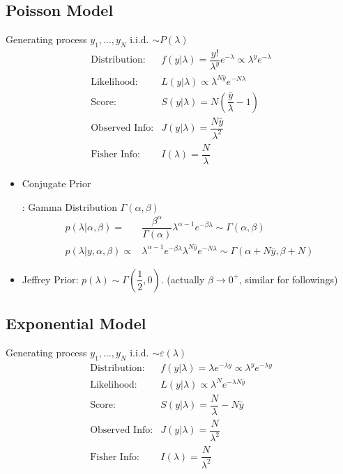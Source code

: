 \subsection{Poisson Model}\label{SubSubSectionBayesianPoisson}
Generating process $ y_1,\ldots,y_N $ i.i.d. $ \sim P(\lambda ) $
\begin{align*}
    \text{Distribution:}&f(y|\lambda )=\dfrac{y!}{\lambda ^y}e^{-\lambda }\propto\lambda ^ye^{-\lambda }\\
    \text{Likelihood:}&L(y|\lambda )\propto \lambda^{N\bar{y}}e^{-N\lambda } \\
    \text{Score:}&S(y|\lambda )=N(\dfrac{\bar{y}}{\lambda }-1)\\
    \text{Observed Info:}&J(y|\lambda )=\dfrac{N\bar{y}}{\lambda^2 }\\
    \text{Fisher Info:}&I(\lambda )=\dfrac{N}{\lambda }
\end{align*}


\begin{itemize}[topsep=2pt,itemsep=0pt]
    \item \hypertarget{PoissonConjugate}{Conjugate Prior}: Gamma Distribution $ \Gamma (\alpha ,\beta  ) $
    \begin{align*}
        p(\lambda|\alpha ,\beta  )=&\dfrac{ \beta ^\alpha   }{ \Gamma (\alpha ) }\lambda ^{\alpha -1}e^{-\beta  \lambda }\sim \Gamma (\alpha ,\beta  )\\
        p(\lambda |y,\alpha ,\beta )\propto&\lambda ^{\alpha -1}e^{-\beta  \lambda }\lambda ^{N\bar{y}}e^{-N\lambda }\sim \Gamma (\alpha +N\bar{y}, \beta +N)
    \end{align*}

    \item Jeffrey Prior: $ p(\lambda )\sim \Gamma (\dfrac{ 1 }{ 2 } ,0) $. (actually $ \beta \to 0^+ $, similar for followings)
\end{itemize}

    






\subsection{Exponential Model}\label{SubSubSectionBayesianExp}

Generating process $ y_1,\ldots,y_N $ i.i.d. $ \sim \varepsilon (\lambda ) $
\begin{align*}
    \text{Distribution:}&f(y|\lambda )=\lambda e^{-\lambda y}\propto\lambda ^ye^{-\lambda y }\\
    \text{Likelihood:}&L(y|\lambda )\propto \lambda^{N}e^{-\lambda N\bar{y} } \\
    \text{Score:}&S(y|\lambda )=\dfrac{N}{\lambda }-N\bar{y}\\
    \text{Observed Info:}&J(y|\lambda )=\dfrac{N}{\lambda^2 }\\
    \text{Fisher Info:}&I(\lambda )=\dfrac{N}{\lambda^2 }
\end{align*}

